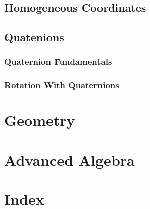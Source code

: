 \documentclass[a4paper,10pt]{article}
\begin{document}
\subsection{Homogeneous Coordinates}
\subsection{Quatenions}
\subsubsection{Quaternion Fundamentals}
\subsubsection{Rotation With Quaternions}
\section{Geometry}
\section{Advanced Algebra}
\section{Index}
\end{document}
